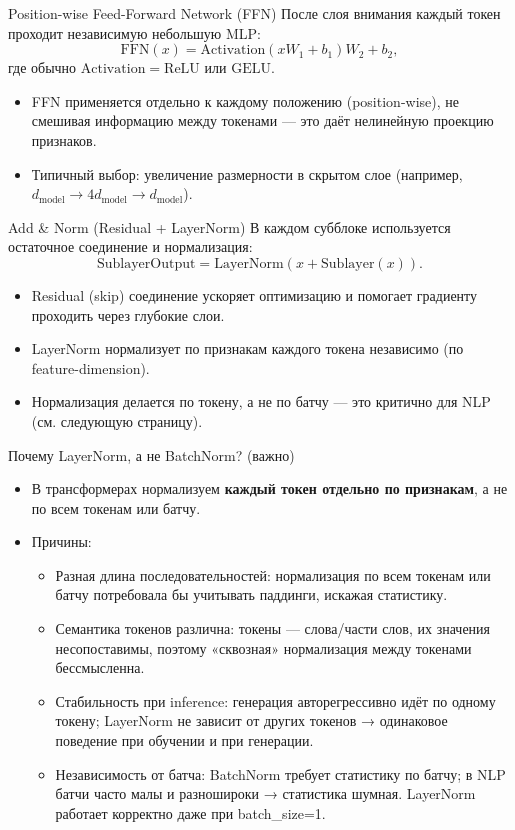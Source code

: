 \documentclass[aspectratio=1610,12pt]{beamer}
\begin{document}
\begin{frame}{Position-wise Feed-Forward Network (FFN)}
\small
После слоя внимания каждый токен проходит независимую небольшую MLP:
\[
\mathrm{FFN}(x) = \mathrm{Activation}(xW_1 + b_1)W_2 + b_2,
\]
где обычно \(\mathrm{Activation}=\mathrm{ReLU}\) или \(\mathrm{GELU}\).
\begin{itemize}
  \item FFN применяется отдельно к каждому положению (position-wise), не смешивая информацию между токенами — это даёт нелинейную проекцию признаков.
  \item Типичный выбор: увеличение размерности в скрытом слое (например, $d_\text{model}\to 4d_\text{model}\to d_\text{model}$).
\end{itemize}
\end{frame}

\begin{frame}{Add \& Norm (Residual + LayerNorm)}
\small
В каждом субблоке используется остаточное соединение и нормализация:
\[
\text{SublayerOutput} = \mathrm{LayerNorm}(x + \text{Sublayer}(x)).
\]
\begin{itemize}
  \item Residual (skip) соединение ускоряет оптимизацию и помогает градиенту проходить через глубокие слои.
  \item LayerNorm нормализует по признакам каждого токена независимо (по feature-dimension).
  \item Нормализация делается по токену, а не по батчу — это критично для NLP (см. следующую страницу).
\end{itemize}
\end{frame}

\begin{frame}{Почему LayerNorm, а не BatchNorm? (важно)}
\small
\begin{itemize}
  \item В трансформерах нормализуем \textbf{каждый токен отдельно по признакам}, а не по всем токенам или батчу.
  \item Причины:
  \begin{itemize}
    \item Разная длина последовательностей: нормализация по всем токенам или батчу потребовала бы учитывать паддинги, искажая статистику.
    \item Семантика токенов различна: токены — слова/части слов, их значения несопоставимы, поэтому «сквозная» нормализация между токенами бессмысленна.
    \item Стабильность при inference: генерация авторегрессивно идёт по одному токену; LayerNorm не зависит от других токенов → одинаковое поведение при обучении и при генерации.
    \item Независимость от батча: BatchNorm требует статистику по батчу; в NLP батчи часто малы и разношироки → статистика шумная. LayerNorm работает корректно даже при batch_size=1.
  \end{itemize}
\end{itemize}
\end{frame}
\end{document}
